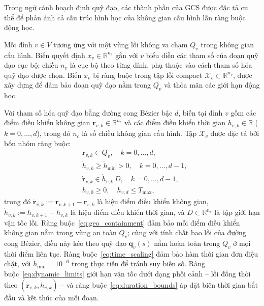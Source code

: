 Trong ngữ cảnh hoạch định quỹ đạo, các thành phần của GCS được đặc tả cụ thể để
phản ánh cả cấu trúc hình học của không gian cấu hình lẫn ràng buộc động học.

Mỗi đỉnh $v \in V$ tương ứng với một vùng lồi không va chạm $Q_v$ trong không
gian cấu hình. Biến quyết định $x_v \in \mathbb{R}^{n_v}$ gắn với $v$ biểu diễn
các tham số của đoạn quỹ đạo cục bộ; chiều $n_v$ là cục bộ theo từng đỉnh, phụ
thuộc vào cách tham số hóa quỹ đạo được chọn. Biến $x_v$ bị ràng buộc trong tập
lồi compact $\mathcal{X}_v \subset \mathbb{R}^{n_v}$, được xây dựng để đảm bảo
đoạn quỹ đạo nằm trong $Q_v$ và thỏa mãn các giới hạn động học.

Với tham số hóa quỹ đạo bằng đường cong Bézier bậc $d$, biến tại đỉnh $v$ gồm
các điểm điều khiển không gian $\mathbf{r}_{v,k} \in \mathbb{R}^{n_c}$ và các
điểm điều khiển thời gian $h_{v,k} \in \mathbb{R}$ ($k = 0, \ldots, d$), trong
đó $n_c$ là số chiều không gian cấu hình. Tập $\mathcal{X}_v$ được đặc tả bởi
bốn nhóm ràng buộc:
\begin{align}
   & \mathbf{r}_{v,k} \in Q_v,
  \quad k = 0, \ldots, d,
  \label{eq:geo_containment}                       \\
   & \dot{h}_{v,k} \ge \dot{h}_{\min} > 0,
  \quad k = 0, \ldots, d-1,
  \label{eq:time_scaling}                          \\
   & \dot{\mathbf{r}}_{v,k} \in \dot{h}_{v,k}\, D,
  \quad k = 0, \ldots, d-1,
  \label{eq:dynamic_limits}                        \\
   & h_{v,0} \ge 0,
  \quad h_{v,d} \le T_{\max},
  \label{eq:duration_bounds}
\end{align}
trong đó $\dot{\mathbf{r}}_{v,k} := \mathbf{r}_{v,k+1} - \mathbf{r}_{v,k}$ là hiệu
điểm điều khiển không gian, $\dot{h}_{v,k} := h_{v,k+1} - h_{v,k}$ là hiệu điểm
điều khiển thời gian, và $D \subset \mathbb{R}^{n_c}$ là tập giới hạn vận tốc lồi.
Ràng buộc~\eqref{eq:geo_containment} đảm bảo mỗi điểm điều khiển không gian nằm
trong vùng an toàn $Q_v$; cùng với tính chất bao lồi của đường cong Bézier, điều
này kéo theo quỹ đạo $\mathbf{q}_v(s)$ nằm hoàn toàn trong $Q_v$ ở mọi thời điểm
liên tục.
Ràng buộc~\eqref{eq:time_scaling} đảm bảo hàm thời gian đơn điệu chặt, với $\dot{h}_{\min} = 10^{-6}$ trong thực tiễn để tránh suy biến số.
Ràng buộc~\eqref{eq:dynamic_limits} giới hạn vận tốc dưới dạng phối cảnh -- lồi
đồng thời theo $(\dot{\mathbf{r}}_{v,k}, \dot{h}_{v,k})$ -- và
ràng buộc~\eqref{eq:duration_bounds} áp đặt biên thời gian bắt đầu và kết thúc của
mỗi đoạn.

